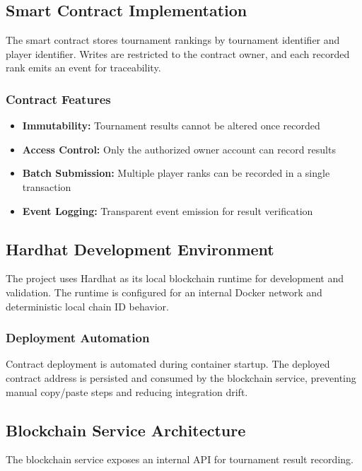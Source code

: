 \documentclass[11pt,a4paper]{report}
\begin{document}
\subsection{Smart Contract Implementation}

The smart contract stores tournament rankings by tournament identifier and player identifier. Writes are restricted to the contract owner, and each recorded rank emits an event for traceability.

\subsubsection{Contract Features}
\begin{itemize}
  \item \textbf{Immutability:} Tournament results cannot be altered once recorded
  \item \textbf{Access Control:} Only the authorized owner account can record results
  \item \textbf{Batch Submission:} Multiple player ranks can be recorded in a single transaction
  \item \textbf{Event Logging:} Transparent event emission for result verification
\end{itemize}

\subsection{Hardhat Development Environment}

The project uses Hardhat as its local blockchain runtime for development and validation. The runtime is configured for an internal Docker network and deterministic local chain ID behavior.

\subsubsection{Deployment Automation}
Contract deployment is automated during container startup. The deployed contract address is persisted and consumed by the blockchain service, preventing manual copy/paste steps and reducing integration drift.

\subsection{Blockchain Service Architecture}

The blockchain service exposes an internal API for tournament result recording.
\end{document}
